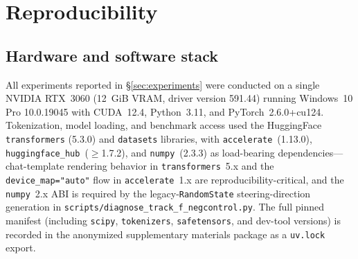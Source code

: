 \appendix
\section{Reproducibility}\label{sec:reproducibility}

\subsection{Hardware and software stack}
All experiments reported in §\ref{sec:experiments} were conducted on a single NVIDIA RTX~3060 (12~GiB VRAM, driver version 591.44) running Windows~10 Pro 10.0.19045 with CUDA~12.4, Python~3.11, and PyTorch~2.6.0+cu124. Tokenization, model loading, and benchmark access used the HuggingFace \texttt{transformers} (5.3.0) and \texttt{datasets} libraries, with \texttt{accelerate}~(1.13.0), \texttt{huggingface\_hub}~($\geq$1.7.2), and \texttt{numpy}~(2.3.3) as load-bearing dependencies---chat-template rendering behavior in \texttt{transformers}~5.x and the \texttt{device\_map="auto"} flow in \texttt{accelerate}~1.x are reproducibility-critical, and the \texttt{numpy}~2.x ABI is required by the legacy-\texttt{RandomState} steering-direction generation in \texttt{scripts/diagnose\_track\_f\_negcontrol.py}. The full pinned manifest (including \texttt{scipy}, \texttt{tokenizers}, \texttt{safetensors}, and dev-tool versions) is recorded in the anonymized supplementary materials package as a \texttt{uv.lock} export.

